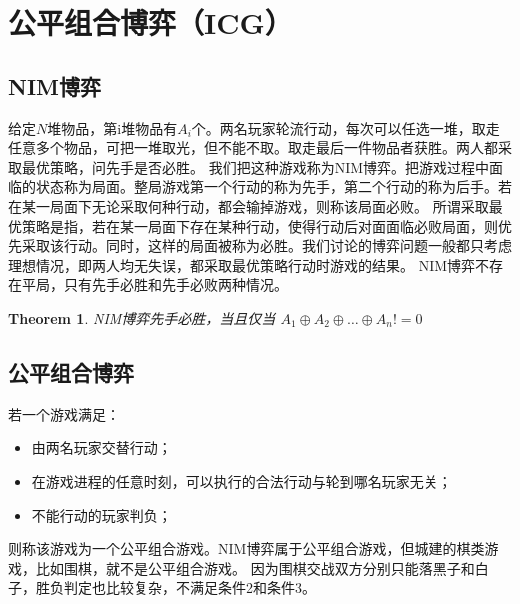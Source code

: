 \documentclass[12pt,a4paper,UTF16]{ctexbook}
\theoremstyle{plain}
\newtheorem{theorem}{\indent Theorem}[section]
\begin{document}
\section{公平组合博弈（ICG）}
\subsection{NIM博弈}
给定$N$堆物品，第i堆物品有$A_i$个。两名玩家轮流行动，每次可以任选一堆，取走任意多个物品，可把一堆取光，但不能不取。取走最后一件物品者获胜。两人都采取最优策略，问先手是否必胜。
我们把这种游戏称为NIM博弈。把游戏过程中面临的状态称为局面。整局游戏第一个行动的称为先手，第二个行动的称为后手。若在某一局面下无论采取何种行动，都会输掉游戏，则称该局面必败。
所谓采取最优策略是指，若在某一局面下存在某种行动，使得行动后对面面临必败局面，则优先采取该行动。同时，这样的局面被称为必胜。我们讨论的博弈问题一般都只考虑理想情况，即两人均无失误，都采取最优策略行动时游戏的结果。
NIM博弈不存在平局，只有先手必胜和先手必败两种情况。
\begin{theorem}
NIM博弈先手必胜，当且仅当 $A_1 \oplus A_2 \oplus … \oplus A_n != 0$
\end{theorem}
\subsection{公平组合博弈}
若一个游戏满足：
\begin{itemize}
\item 由两名玩家交替行动；
\item 在游戏进程的任意时刻，可以执行的合法行动与轮到哪名玩家无关；
\item 不能行动的玩家判负；
\end{itemize}
则称该游戏为一个公平组合游戏。NIM博弈属于公平组合游戏，但城建的棋类游戏，比如围棋，就不是公平组合游戏。
因为围棋交战双方分别只能落黑子和白子，胜负判定也比较复杂，不满足条件2和条件3。
\end{document}
